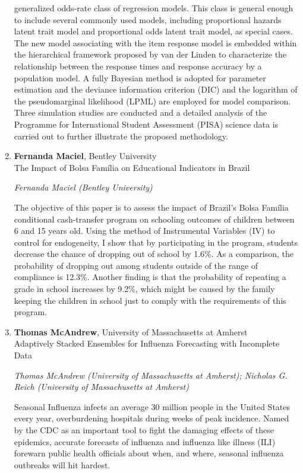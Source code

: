\begin{enumerate}
generalized odds-rate class of regression models. This class is general enough to include several commonly used models, including proportional hazards latent trait model and proportional odds latent trait model, as special cases. The new model associating with the item response model is embedded within the hierarchical framework proposed by van der Linden to characterize the relationship between the response times and response accuracy by a population model. A fully Bayesian method is adopted for parameter estimation and the deviance information criterion (DIC) and the logarithm of the pseudomarginal likelihood (LPML) are employed for model comparison. Three simulation studies are conducted and a detailed analysis of the Programme for International Student Assessment (PISA) science data is carried out to further illustrate the proposed methodology.

\item \textbf{Fernanda Maciel}, Bentley University \\
The Impact of Bolsa Família on Educational Indicators in Brazil

\emph{\footnotesize Fernanda Maciel (Bentley University)}

The objective of this paper is to assess the impact of Brazil's Bolsa Família conditional cash-transfer program on schooling outcomes of children between 6 and 15 years old. Using the method of Instrumental Variables (IV) to control for endogeneity, I show that by participating in the program, students decrease the chance of dropping out of school by 1.6\%. As a comparison, the probability of dropping out among students outside of the range of compliance is 12.3\%. Another finding is that the probability of repeating a grade in school increases by 9.2\%, which might be caused by the family keeping the children in school just to comply with the requirements of this program.

\item \textbf{Thomas McAndrew}, University of Massachusetts at Amherst \\
Adaptively Stacked Ensembles for Influenza Forecasting with Incomplete Data

\emph{\footnotesize Thomas McAndrew (University of Massachusetts at Amherst); Nicholas G. Reich (University of Massachusetts at Amherst)}

Seasonal Influenza infects an average 30 million people in the United States every year, overburdening hospitals during weeks of peak incidence. Named by the CDC as an important tool to fight the damaging effects of these epidemics, accurate forecasts of influenza and influenza like illness (ILI) forewarn public health officials about when, and where, seasonal influenza outbreaks will hit hardest.


\end{enumerate}
